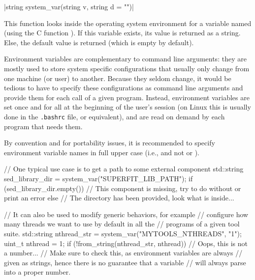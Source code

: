 \funcitem \cppinline|string system_var(string v, string d = "")| 

This function looks inside the operating system environment for a variable named  (using the C function ). If this variable exists, its value is returned as a string. Else, the default value  is returned (which is empty by default).

Environment variables are complementary to command line arguments: they are mostly used to store system specific configurations that usually only change from one machine (or user) to another. Because they seldom change, it would be tedious to have to specify these configurations as command line arguments and provide them for each call of a given program. Instead, environment variables are set once and for all at the beginning of the user's session (on Linux this is usually done in the \texttt{.bashrc} file, or equivalent), and are read on demand by each program that needs them.

By convention and for portability issues, it is recommended to specify environment variable names in full upper case (i.e.,  and not  or ).

\begin{example}
\begin{cppcode}
// One typical use case is to get a path to some external component
std::string sed_library_dir = system_var("SUPERFIT_LIB_PATH");
if (sed_library_dir.empty()) {
    // This component is missing, try to do without or print an error
} else {
    // The directory has been provided, look what is inside...
}

// It can also be used to modify generic behaviors, for example
// configure how many threads we want to use by default in all the
// programs of a given tool suite.
std::string nthread_str = system_var("MYTOOLS_NTHREADS", "1");
uint_t nthread = 1;
if (!from_string(nthread_str, nthread)) {
    // Oops, this is not a number...
    // Make sure to check this, as environment variables are always
    // given as strings, hence there is no guarantee that a variable
    // will always parse into a proper number.
}
\end{cppcode}
\end{example}
